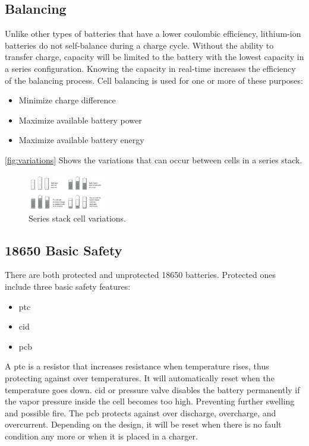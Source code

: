 \subsection{Balancing}
Unlike other types of batteries that have a lower coulombic efficiency, lithium-ion batteries do not self-balance during a charge cycle. Without the ability to transfer charge, capacity will be limited to the battery with the lowest capacity in a series configuration. Knowing the capacity in real-time increases the efficiency of the balancing process.
Cell balancing is used for one or more of these purposes\cite{book183}:

\begin{itemize}[noitemsep]
	\item Minimize charge difference
	\item Maximize available battery power
	\item Maximize available battery energy
\end{itemize}

\autoref{fig:variations} Shows the variations that can occur between cells in a series stack.

\begin{figure}[H]
	\centering
	\includegraphics[width=0.3\textwidth]{Figures/variations.png} 
	\caption{Series stack cell variations.}
	\label{fig:variations}
\end{figure}

\subsection{18650 Basic Safety}
There are both protected and unprotected 18650 batteries. Protected ones include three basic safety features\cite{webpage}:

\begin{itemize}[noitemsep]
	\item \gls{ptc}
	\item \gls{cid}
	\item \gls{pcb}
\end{itemize}

A \gls{ptc} is a resistor that increases resistance when temperature rises, thus protecting against over temperatures. It will automatically reset when the temperature goes down.
\gls{cid} or pressure valve disables the battery permanently if the vapor pressure inside the cell becomes too high. Preventing further swelling and possible fire.
The \gls{pcb} protects against over discharge, overcharge, and overcurrent. Depending on the design, it will be reset when there is no fault condition any more or when it is placed in a charger.  


